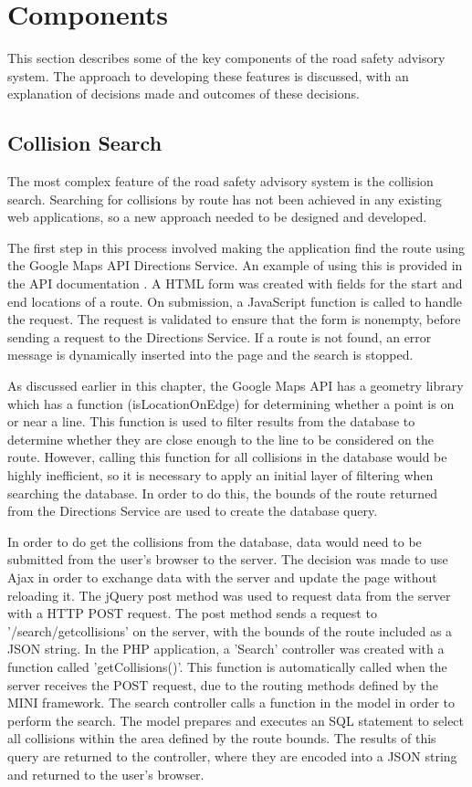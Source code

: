 \documentclass[authoryearcitations]{UoYCSproject}
\begin{document}
\section{Components}

This section describes some of the key components of the road safety advisory system. The approach to developing these features is discussed, with an explanation of decisions made and outcomes of these decisions. 

\subsection{Collision Search}

The most complex feature of the road safety advisory system is the collision search. Searching for collisions by route has not been achieved in any existing web applications, so a new approach needed to be designed and developed. 

The first step in this process involved making the application find the route using the Google Maps API Directions Service. An example of using this is provided in the API documentation \citep{Google}. A HTML form was created with fields for the start and end locations of a route. On submission, a JavaScript function is called to handle the request. The request is validated to ensure that the form is nonempty, before sending a request to the Directions Service. If a route is not found, an error message is dynamically inserted into the page and the search is stopped. 

As discussed earlier in this chapter, the Google Maps API has a geometry library which has a function (isLocationOnEdge) for determining whether a point is on or near a line. This function is used to filter results from the database to determine whether they are close enough to the line to be considered on the route. However, calling this function for all collisions in the database would be highly inefficient, so it is necessary to apply an initial layer of filtering when searching the database. In order to do this, the bounds of the route returned from the Directions Service are used to create the database query. 

In order to do get the collisions from the database, data would need to be submitted from the user's browser to the server. The decision was made to use Ajax in order to exchange data with the server and update the page without reloading it. The jQuery \citep{ThejQueryFoundation} post method was used to request data from the server with a HTTP POST request. The post method sends a request to '/search/getcollisions' on the server, with the bounds of the route included as a JSON string. In the PHP application, a 'Search' controller was created with a function called 'getCollisions()'. This function is automatically called when the server receives the POST request, due to the routing methods defined by the MINI framework. The search controller calls a function in the model in order to perform the search. The model prepares and executes an SQL statement to select all collisions within the area defined by the route bounds. The results of this query are returned to the controller, where they are encoded into a JSON string and returned to the user's browser.
\end{document}
